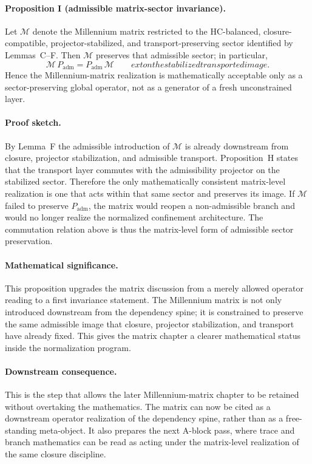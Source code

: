 \documentclass[12pt,a4paper]{article}
\begin{document}
\paragraph{Proposition I (admissible matrix-sector invariance).}
Let $\mathcal M$ denote the Millennium matrix restricted to the HC-balanced,
closure-compatible, projector-stabilized, and transport-preserving sector
identified by Lemmas~C--F. Then $\mathcal M$ preserves that admissible sector;
in particular,
\[
\mathcal M\,P_{\mathrm{adm}} = P_{\mathrm{adm}}\,\mathcal M
\qquad	ext{on the stabilized transported image.}
\]
Hence the Millennium-matrix realization is mathematically acceptable only as a
sector-preserving global operator, not as a generator of a fresh unconstrained
layer.

\paragraph{Proof sketch.}
By Lemma~F the admissible introduction of $\mathcal M$ is already downstream
from closure, projector stabilization, and admissible transport. Proposition~H
states that the transport layer commutes with the admissibility projector on the
stabilized sector. Therefore the only mathematically consistent matrix-level
realization is one that acts within that same sector and preserves its image.
If $\mathcal M$ failed to preserve $P_{\mathrm{adm}}$, the matrix would reopen a
non-admissible branch and would no longer realize the normalized confinement
architecture. The commutation relation above is thus the matrix-level form of
admissible sector preservation.

\paragraph{Mathematical significance.}
This proposition upgrades the matrix discussion from a merely allowed operator
reading to a first invariance statement. The Millennium matrix is not only
introduced downstream from the dependency spine; it is constrained to preserve
the same admissible image that closure, projector stabilization, and transport
have already fixed. This gives the matrix chapter a clearer mathematical status
inside the normalization program.

\paragraph{Downstream consequence.}
This is the step that allows the later Millennium-matrix chapter to be retained
without overtaking the mathematics. The matrix can now be cited as a downstream
operator realization of the dependency spine, rather than as a free-standing
meta-object. It also prepares the next A-block pass, where trace and branch
mathematics can be read as acting under the matrix-level realization of the same
closure discipline.
\end{document}
